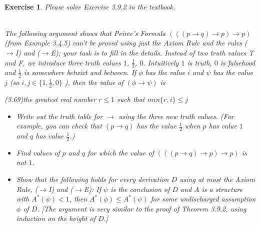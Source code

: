 \documentclass[12pt,a4paper]{article}
\theoremstyle{plain}
\newtheorem{exercise}{Exercise}
\begin{document}
\ \\
\begin{exercise}
Please solve Exercise 3.9.2 in the textbook.

\ \\
The following argument shows that Peirce's Formula $((( p \rightarrow q) \rightarrow p) \rightarrow p)$ (from Example 3.4.5) can't be proved using just the Axiom Rule and the rules ($\rightarrow$I) and ($\rightarrow$E); your task is to fill in the details. 
Instead of two truth values T and F, we introduce three truth values $1$, $\frac{1}{2}$, $0$. 
Intuitively $1$ is truth, $0$ is falsehood and $\frac{1}{2}$ is somewhere betwixt and between. 
If $\phi$ has the value $i$ and $\psi$ has the value $j$ (so $i , j \in \{ 1, \frac{1}{2} , 0 \}$ ), then the value of $( \phi \rightarrow \psi )$ is 
%
\begin{center}
(3.69)\qquad the greatest real number $r \leq 1$ such that $min \{ r, i \} \leq j$
\end{center}
%
\begin{itemize}

\item[(a)] Write out the truth table for $\rightarrow$ using the three new truth values.
(For example, you can check that $( p \rightarrow q )$ has the value $\frac{1}{2}$ when $p$ has value $1$ and $q$ has value $\frac{1}{2}$.)

\item[(b)] Find values of $p$ and $q$ for which the value of $((( p \rightarrow q) \rightarrow p) \rightarrow p)$ is not $1$.

\item[(c)] Show that the following holds for every derivation $D$ using at most the Axiom Rule, ($\rightarrow$I) and ($\rightarrow$E): 
If $\psi$ is the conclusion of $D$ and $A$ is a structure with $A^* (\psi) < 1$, then $A^*( \phi ) \leq A^* (\psi)$ for some
undischarged assumption $\phi$ of $D$. 
[The argument is very similar to the proof of Theorem 3.9.2, using induction on the height of $D$.]
\end{itemize}
\end{exercise}
\end{document}
